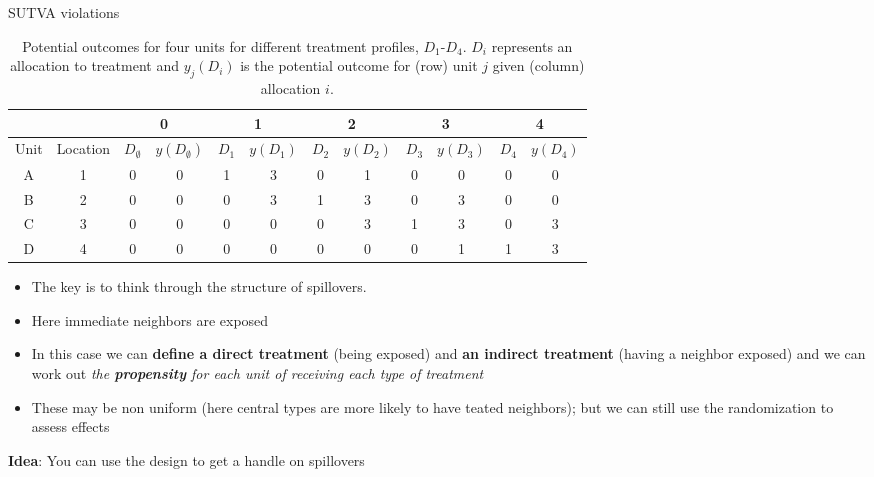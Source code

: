 \documentclass[
  11pt,
  ignorenonframetext,
]{beamer}
\providecommand{\tightlist}{%
  \setlength{\itemsep}{0pt}\setlength{\parskip}{0pt}}\usepackage{longtable,booktabs,array}
\begin{document}
\begin{frame}{SUTVA violations}
\protect\hypertarget{sutva-violations-1}{}
\begin{table}
\scriptsize
    \begin{center}
    \tiny
    \begin{tabular}{cc|cc|cc|cc|cc|cc}
     & & \multicolumn{2}{c}{0} & \multicolumn{2}{c}{1} & \multicolumn{2}{c}{2}  & \multicolumn{2}{c}{3}& \multicolumn{2}{c}{4}\\ \hline 
    Unit    &   Location&   $D_\emptyset$ & $y(D_\emptyset)$ & $D_1$        & $y(D_1)$  &  $D_2$        & $y(D_2)$   &$D_3$     & $y(D_3)$    &$D_4$        & $y(D_4)$    \\
    \hline
    A   &   1 & 0 & 0   & 1 &3 &0 &1 & 0 & 0 &0 &0\\
    B & 2 & 0 & 0 & 0 &3 &1 &3 & 0 & 3 &0 &0\\
    C & 3 & 0 & 0 & 0 &0 &0 &3 & 1 & 3 &0 &3\\
    D & 4 & 0 & 0 & 0 &0 &0 &0 & 0 & 1 &1 &3\\
    \end{tabular}
    \end{center}    \scriptsize
    \caption{Potential outcomes for four units for different treatment profiles, $D_1$-$D_4$. $D_i$ represents an allocation to treatment and $y_j(D_i)$ is the potential outcome for (row) unit $j$ given (column) allocation $i$.} 
    \label{PotentialOutcomes51}
\end{table}

\begin{itemize}
\tightlist
\item
  The key is to think through the structure of spillovers.
\item
  Here immediate neighbors are exposed
\item
  In this case we can \textbf{define a direct treatment} (being exposed)
  and \textbf{an indirect treatment} (having a neighbor exposed) and we
  can work out
  \textit{the \textbf{propensity} for each unit of receiving each type of treatment}\\
\item
  These may be non uniform (here central types are more likely to have
  teated neighbors); but we can still use the randomization to assess
  effects
\end{itemize}

\textbf{Idea}: You can use the design to get a handle on spillovers
\end{frame}
\end{document}
